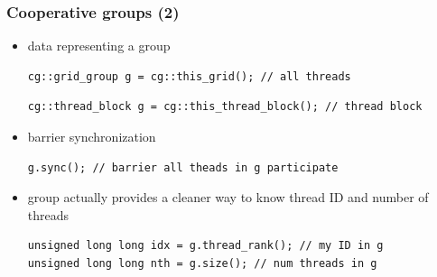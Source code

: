 \documentclass[12pt,dvipdfmx]{beamer}
\begin{document}
\begin{frame}[fragile]
\frametitle{Cooperative groups (2)}
\begin{itemize}
\item data representing a group
\begin{lstlisting}
cg::grid_group g = cg::this_grid(); // all threads
\end{lstlisting}
\begin{lstlisting}
cg::thread_block g = cg::this_thread_block(); // thread block
\end{lstlisting}

\item barrier synchronization
\begin{lstlisting}
g.sync(); // barrier all theads in g participate
\end{lstlisting}

\item group actually provides a cleaner way to know thread ID and number of threads
\begin{lstlisting}
unsigned long long idx = g.thread_rank(); // my ID in g
unsigned long long nth = g.size(); // num threads in g
\end{lstlisting}
\end{itemize}
\end{frame}
\end{document}
